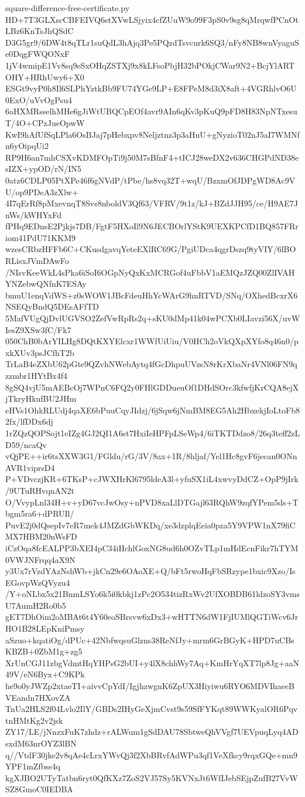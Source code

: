 \documentclass[11pt]{article}
\theoremstyle{definition}
\theoremstyle{remark}
\begin{document}
\begin{filecontents*}[overwrite]{square-difference-free-certificate.py}
HD+7T3GLXscCBFEIVQ6stXVwLSjyix4cfZUuW9o99F3pS0v9sg8qMrqwfPCnOtLBz6KnTsJhQSdC
D3G5gr9/6DW4t8qTLr1suQdL3hAjq3Pe5PQzdTsvcurk6SQ3/nFy8NB8wnVyaguSe0DqgFWQONxF
1jV4wmipE1Vv8sq9eSxOHqZSTXj9x8kLFsoPbjH32bPOkjCWar9N2+BcjYlARTOHY+HRhUwy6+X0
ESGt9vyP0h8Il6SLPhYztkBb9FU74YGe9LP+E8FPeM8d3iX8aft+4VGRhlvO6U0ExO/uVvOgPsu4
6aHXMRsselhMHe6gJiWtUBQCpEOf4avr9AIn6qKv3pKuQ9pFD8H83NpNTxesuT/4O+CPzJueOpwW
KwI9hAfUfSqLPla6OsBJaj7pHebxpv8Neljztnz3p3aHuU+gNyzioT02nJ5aI7WMNfn6yOipqUi2
RP9H6an7mhCSXvKDMFOpTi9j50M7sBfnF4+tICJ28weDX2v636CHGPdND38esIZX+ypOD/rN/IN5
0atz6CDLP05PtXPe46f6gNVdP/tPbe/hs8vq32T+wqU/BzxmOfJDPgWD8Ac9VU/op9PDeA3zXlw+
4I7qErRf8pMxevnqT8Svs8nboldV3Qf63/VFRV/9t1z/kJ+BZdJJH95/ce/H9AE7JnWs/kWHYxFd
fPHq9EDnsE2Pjkjs7DB/FgtF5HXoIl9N6JECBOrlYStK9UEXKPCfD1BQ857FRriom41PdU71KKM9
wzesCRbzHFFb6C+CKusdgavqYeteEXlRC69G/PgiUDca4qgrDszq9tyVIY/6lBORLisxJVmDAwFo
/NIsvKeeWkL4sPka6iSoI6OGpNyQxKxMCRGof4uFbbV1aEMQzJZQ00ZlIVAHYNZebwQNfnK7ESAy
bmuU1enqVdWS+z0sWOW1JBcFdeuHhYcWArG9hnRTVD/SNq/OXhedBcxrX6NSEQyBndQ5DEsAFfTD
5MafVUgQjDvlUGVSO2ZefVwRpRs2q+sKU0dMp41k04wPCXb0LIavzi56X/uvWIesZ9XSw3fC/Fk7
050ChB0bArYILHg8DQtKXYElcxr1WWfUiUiu/V0HCh2oVkQXpXYfo8q46n0/pxkXUv3psJCfhT2b
TrLaB4eZXbU62pGte9QZvhNWebAytq4fGcDhpuUVzsN8rKrXbaNr4VNl06FN9qzzmbr1HYtBx4f4
8gSQ4vjU5mAEBcOj7WPnC6FQ2y0FHlGDDueuOf1DHdSOrc3kfwfjKrCQA8ejXjTkryHkufBU2JHm
eHVs1OhkRLUdj4qaXE6bPuuCqyJIdzj/6jSqw6jNmBM8EG5Ah2HbxekjIoLtoFb82fx/lfDDx6dj
1rZQzQOPSojt1eIZg4GJ2QI1A6st7HxiIeHPFpLSeWp4/6iTKTDdzo8/26q3teff2zLD59/ncaQv
vQjPE++ir6tsXXW3G1/FGldu/rG/3V/8ax+1R/8hljaf/Yel1Hc8gvF6jecan0ONnAVR1viprsD4
P+VDvczjKR+6TKsP+cJWXHrKl6795ldeA3l+yfuSX1iL4xwvyDdCZ+OpP9jIrk/9UTuRHvqnAN2t
O/VvypLnl34H+v+yD67vcJwOsy+nPVD8xaLlDTGajl63RQhW9zqfYPem5ds+Tbgm5ra6+dPRUIl/
PuvE2j0dQsepIv7eR7mek4JMZdGbWKDq/xe3dzplqEeia0pza5Y9VPW1nX79fiCMX7HBM20nWsFD
iCzOqa8fcEALPP3bXEI4pC34iHchlGoxNG8ud6h0OZvTLp1mHdEcnFikr7hTYM0VWJNFrqq4aX9N
y3Ux7rVzdYAzNshWb+jkCn29e6OAoXE+Q/bFt5rwoHqFbSRzype1bxic9Xzo/IsEGovpWzQVyzu4
/Y+oNLbx5x21BnmLSYo6k5i0kbkj1zPc2O534tizRxWv2UfXOBDB61ldzoSY3vmsU7AumH2Ro0b5
gET7DhOim2oMBAt6t4Y60eoSBrsvw6xDx3+wHTTN6dW1FjIUMlQGTiWcv6JrHO1B28LEpKniPmsy
aSzuo+kqatiOg/dPUc+42NbfwqsuGlzns38ReNfJy+mrm6GrBGyK+HPD7uCBsKBZB+0ZbM1g+zg5
XrUnCGJ11zbgVdmtHqYHPsG2bUI+y4lX8chhWy7Aq+KmHrYqXT7lp8Jg+aaN49V/eN6Byx+C9KPk
he9o0yJWZp2xtaeTI+aivvCpYdI/IgjhzwgnK6ZpUX3Hiyiwu6RYO6MDVIhaeeBVEandn7HXovZA
TnUa2HLS2f04Lvlo2IlY/GBDs2IHyGeXjmCvst9s59SfFYKqt89WWKyalOR6PqvtnHMtKg2v2jsk
ZY17/LE/jNnzxFuK7zhdz+rALWum1gSdDAU78SbtweQhVVgf7UEVpuqLyq4ADsxdM63nrOYZ3lBN
q//VtdF30jke2v8qAe4cLrxYWvQj3f2XbBRvfAdWPu3qf1VeXfkcy9rqxGQe+mn9YPF1mZfbss4q
kgXJBO2UTyTatbn6ryt0QfKXz7ZoS2VJ57Sy5KVNxJt6WfIJebSEjpZufB27VvWSZ8GmoC0IEDBA

\end{filecontents*}
\end{document}
